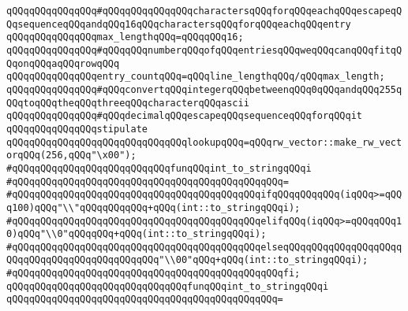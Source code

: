 \verb|qQQqqQQqqQQqqQQq#qQQqqQQqqQQqqQQqcharactersqQQqforqQQqeachqQQqescapeqQQqsequenceqQQqandqQQq16qQQqcharactersqQQqforqQQqeachqQQqentry|\newline
\newline
\verb|qQQqqQQqqQQqqQQqmax_lengthqQQq=qQQqqQQq16;|\newline
\newline
\verb|qQQqqQQqqQQqqQQq#qQQqqQQqnumberqQQqofqQQqentriesqQQqweqQQqcanqQQqfitqQQqonqQQqaqQQqrowqQQq|\newline
\newline
\verb|qQQqqQQqqQQqqQQqentry_countqQQq=qQQqline_lengthqQQq/qQQqmax_length;|\newline
\newline
\verb|qQQqqQQqqQQqqQQq#qQQqconvertqQQqintegerqQQqbetweenqQQq0qQQqandqQQq255qQQqtoqQQqtheqQQqthreeqQQqcharacterqQQqascii|\newline
\verb|qQQqqQQqqQQqqQQq#qQQqdecimalqQQqescapeqQQqsequenceqQQqforqQQqit|\newline
\newline
\verb|qQQqqQQqqQQqqQQqstipulate|\newline
\verb|qQQqqQQqqQQqqQQqqQQqqQQqqQQqqQQqlookupqQQq=qQQqrw_vector::make_rw_vectorqQQq(256,qQQq"\x00");|\newline
\newline
\verb|#qQQqqQQqqQQqqQQqqQQqqQQqqQQqfunqQQqint_to_stringqQQqi|\newline
\verb|#qQQqqQQqqQQqqQQqqQQqqQQqqQQqqQQqqQQqqQQqqQQqqQQq=|\newline
\verb|#qQQqqQQqqQQqqQQqqQQqqQQqqQQqqQQqqQQqqQQqqQQqifqQQqqQQqqQQq(iqQQq>=qQQq100)qQQq"\\"qQQqqQQqqQQq+qQQq(int::to_stringqQQqi);|\newline
\verb|#qQQqqQQqqQQqqQQqqQQqqQQqqQQqqQQqqQQqqQQqqQQqelifqQQq(iqQQq>=qQQqqQQq10)qQQq"\\0"qQQqqQQq+qQQq(int::to_stringqQQqi);|\newline
\verb|#qQQqqQQqqQQqqQQqqQQqqQQqqQQqqQQqqQQqqQQqqQQqelseqQQqqQQqqQQqqQQqqQQqqQQqqQQqqQQqqQQqqQQqqQQqqQQq"\\00"qQQq+qQQq(int::to_stringqQQqi);|\newline
\verb|#qQQqqQQqqQQqqQQqqQQqqQQqqQQqqQQqqQQqqQQqqQQqqQQqfi;|\newline
\newline
\verb|qQQqqQQqqQQqqQQqqQQqqQQqqQQqqQQqfunqQQqint_to_stringqQQqi|\newline
\verb|qQQqqQQqqQQqqQQqqQQqqQQqqQQqqQQqqQQqqQQqqQQqqQQq=|\newline
